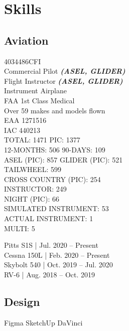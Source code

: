 \documentclass[]{mershon-two-column-resume}
\begin{document}
\begin{minipage}[t]{0.33\textwidth}
		\section{Skills}
		
		\subsection{Aviation}
		4034486CFI \\
		Commercial Pilot {\footnotesize \textit{\textbf{(ASEL, GLIDER)}}} \\
		Flight Instructor {\footnotesize \textit{\textbf{(ASEL, GLIDER)}}} \\
		Instrument Airplane \\
		FAA 1st Class Medical \\
		Over 59 makes and models flown \\
		
		EAA 1271516 \\
		IAC 440213 \\
		
		\sectionsep
		TOTAL: 1471 \textbullet{} PIC: 1377 \\
		12-MONTHS: 506 \textbullet{} 90-DAYS: 109 \\
		ASEL (PIC): 857 \textbullet{} GLIDER (PIC): 521 \\
		TAILWHEEL: 599 \\
		CROSS COUNTRY (PIC): 254 \\
		INSTRUCTOR: 249 \\
		NIGHT (PIC): 66 \\
		SIMULATED INSTRUMENT: 53 \\
		ACTUAL INSTRUMENT: 1 \\
		MULTI: 5 \\
				
		\sectionsep
		
		Pitts S1S | Jul. 2020 – Present \\
		Cessna 150L | Feb. 2020 – Present \\
		Skybolt 540 | Oct. 2019 – Jul. 2020 \\
		RV-6 | Aug. 2018 – Oct. 2019 \\
		
		\sectionsep
		
		\subsection{Design}
		Figma \textbullet{} SketchUp \textbullet{} DaVinci \\
		

\end{minipage}
\end{document}
